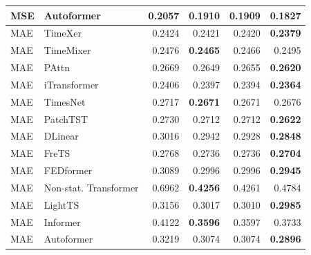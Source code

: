 \begin{longtable}{llrrrr}
MSE & Autoformer & 0.2057 & 0.1910 & 0.1909 & \textbf{0.1827} \\
\midrule
MAE & TimeXer & 0.2424 & 0.2421 & 0.2420 & \textbf{0.2379} \\
MAE & TimeMixer & 0.2476 & \textbf{0.2465} & 0.2466 & 0.2495 \\
MAE & PAttn & 0.2669 & 0.2649 & 0.2655 & \textbf{0.2620} \\
MAE & iTransformer & 0.2406 & 0.2397 & 0.2394 & \textbf{0.2364} \\
MAE & TimesNet & 0.2717 & \textbf{0.2671} & 0.2671 & 0.2676 \\
MAE & PatchTST & 0.2730 & 0.2712 & 0.2712 & \textbf{0.2622} \\
MAE & DLinear & 0.3016 & 0.2942 & 0.2928 & \textbf{0.2848} \\
MAE & FreTS & 0.2768 & 0.2736 & 0.2736 & \textbf{0.2704} \\
MAE & FEDformer & 0.3089 & 0.2996 & 0.2996 & \textbf{0.2945} \\
MAE & Non-stat. Transformer & 0.6962 & \textbf{0.4256} & 0.4261 & 0.4784 \\
MAE & LightTS & 0.3156 & 0.3017 & 0.3010 & \textbf{0.2985} \\
MAE & Informer & 0.4122 & \textbf{0.3596} & 0.3597 & 0.3733 \\
MAE & Autoformer & 0.3219 & 0.3074 & 0.3074 & \textbf{0.2896} \\
\end{longtable}
\endgroup


